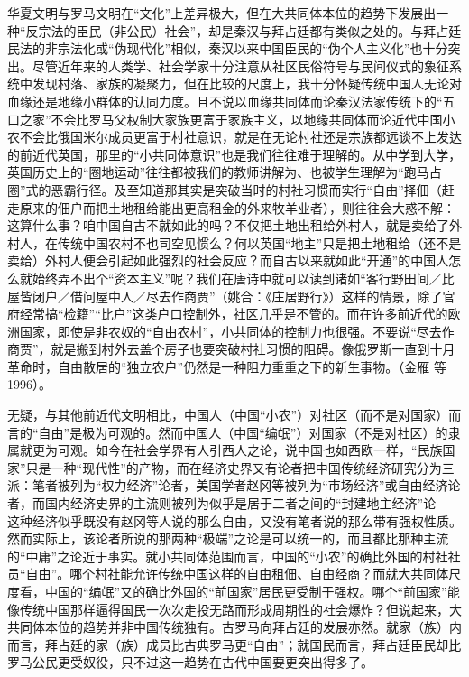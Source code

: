 \documentclass[a4paper,12pt,punct=kaiming]{ctexart}
\begin{document}
华夏文明与罗马文明在“文化”上差异极大，但在大共同体本位的趋势下发展出一种“反宗法的臣民（非公民）社会”，却是秦汉与拜占廷都有类似之处的。与拜占廷民法的非宗法化或“伪现代化”相似，秦汉以来中国臣民的“伪个人主义化”也十分突出。尽管近年来的人类学、社会学家十分注意从社区民俗符号与民间仪式的象征系统中发现村落、家族的凝聚力，但在比较的尺度上，我十分怀疑传统中国人无论对血缘还是地缘小群体的认同力度。且不说以血缘共同体而论秦汉法家传统下的“五口之家”不会比罗马父权制大家族更富于家族主义，以地缘共同体而论近代中国小农不会比俄国米尔成员更富于村社意识，就是在无论村社还是宗族都远谈不上发达的前近代英国，那里的“小共同体意识”也是我们往往难于理解的。从中学到大学，英国历史上的“圈地运动”往往都被我们的教师讲解为、也被学生理解为“跑马占圈”式的恶霸行径。及至知道那其实是突破当时的村社习惯而实行“自由”择佃（赶走原来的佃户而把土地租给能出更高租金的外来牧羊业者），则往往会大惑不解：这算什么事？咱中国自古不就如此的吗？不仅把土地出租给外村人，就是卖给了外村人，在传统中国农村不也司空见惯么？何以英国“地主”只是把土地租给（还不是卖给）外村人便会引起如此强烈的社会反应？而自古以来就如此“开通”的中国人怎么就始终弄不出个“资本主义”呢？我们在唐诗中就可以读到诸如“客行野田间／比屋皆闭户／借问屋中人／尽去作商贾”（姚合：《庄居野行》）这样的情景，除了官府经常搞“检籍”“比户”这类户口控制外，社区几乎是不管的。而在许多前近代的欧洲国家，即使是非农奴的“自由农村”，小共同体的控制力也很强。不要说“尽去作商贾”，就是搬到村外去盖个房子也要突破村社习惯的阻碍。像俄罗斯一直到十月革命时，自由散居的“独立农户”仍然是一种阻力重重之下的新生事物。（金雁 等 1996）。

无疑，与其他前近代文明相比，中国人（中国“小农”）对社区（而不是对国家）而言的“自由”是极为可观的。然而中国人（中国“编氓”）对国家（不是对社区）的隶属就更为可观。如今在社会学界有人引西人之论，说中国也如西欧一样，“民族国家”只是一种“现代性”的产物，而在经济史界又有论者把中国传统经济研究分为三派：笔者被列为“权力经济”论者，美国学者赵冈等被列为“市场经济”或自由经济论者，而国内经济史界的主流则被列为似乎是居于二者之间的“封建地主经济”论——这种经济似乎既没有赵冈等人说的那么自由，又没有笔者说的那么带有强权性质。然而实际上，该论者所说的那两种“极端”之论是可以统一的，而且都比那种主流的“中庸”之论近于事实。就小共同体范围而言，中国的“小农”的确比外国的村社社员“自由”。哪个村社能允许传统中国这样的自由租佃、自由经商？而就大共同体尺度看，中国的“编氓”又的确比外国的“前国家”居民更受制于强权。哪个“前国家”能像传统中国那样逼得国民一次次走投无路而形成周期性的社会爆炸？但说起来，大共同体本位的趋势并非中国传统独有。古罗马向拜占廷的发展亦然。就家（族）内而言，拜占廷的家（族）成员比古典罗马更“自由”；就国民而言，拜占廷臣民却比罗马公民更受奴役，只不过这一趋势在古代中国要更突出得多了。
\end{document}
